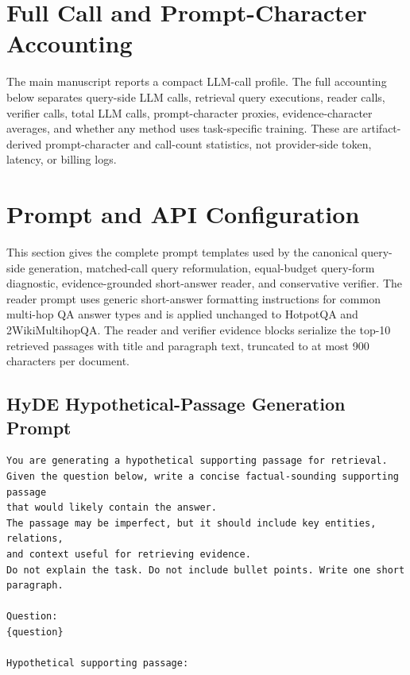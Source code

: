 \documentclass[pdflatex,sn-basic,Numbered]{sn-jnl}
\begin{document}
\section{Full Call and Prompt-Character Accounting}
\label{sec:supp_full_accounting}

The main manuscript reports a compact LLM-call profile. The full accounting below separates query-side LLM calls, retrieval query executions, reader calls, verifier calls, total LLM calls, prompt-character proxies, evidence-character averages, and whether any method uses task-specific training. These are artifact-derived prompt-character and call-count statistics, not provider-side token, latency, or billing logs.





\FloatBarrier
\section{Prompt and API Configuration}
\label{sec:supp_prompt_api}

This section gives the complete prompt templates used by the canonical query-side generation, matched-call query reformulation, equal-budget query-form diagnostic, evidence-grounded short-answer reader, and conservative verifier. The reader prompt uses generic short-answer formatting instructions for common multi-hop QA answer types and is applied unchanged to HotpotQA and 2WikiMultihopQA. The reader and verifier evidence blocks serialize the top-10 retrieved passages with title and paragraph text, truncated to at most 900 characters per document.

\subsection{HyDE Hypothetical-Passage Generation Prompt}
\begingroup\footnotesize
\begin{verbatim}
You are generating a hypothetical supporting passage for retrieval.
Given the question below, write a concise factual-sounding supporting passage
that would likely contain the answer.
The passage may be imperfect, but it should include key entities, relations,
and context useful for retrieving evidence.
Do not explain the task. Do not include bullet points. Write one short paragraph.

Question:
{question}

Hypothetical supporting passage:
\end{verbatim}
\endgroup
\end{document}
